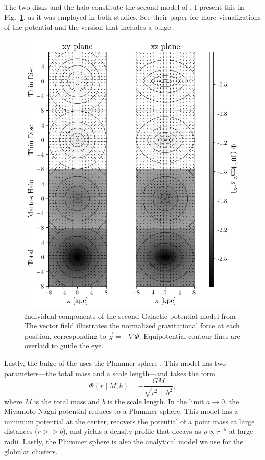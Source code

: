         The two disks and the halo constitute the second model of \citet{2017A&A...598A..66P}. I present this in Fig.~\ref{fig:figure_pouliasis2017pii_potential}, as it was employed in both studies. See their paper for more visualizations of the potential and the version that includes a bulge.
        \begin{figure}
            \centering
            \includegraphics[width=\linewidth]{images/figure_pouliasis2017pii_potential_-8_8.png}
            \caption{Individual components of the second Galactic potential model from \citet{2017A&A...598A..66P}. The vector field illustrates the normalized gravitational force at each position, corresponding to $\vec{g} = -\nabla\Phi$. Equipotential contour lines are overlaid to guide the eye.}
            \label{fig:figure_pouliasis2017pii_potential}
        \end{figure}        

        Lastly, the bulge of the \citet{2017A&A...598A..66P} uses the Plummer sphere \citep{1911MNRAS..71..460P}. This model has two parameters—the total mass and a scale length—and takes the form
        \begin{equation} \label{eq:plummer}
            \Phi(r \mid M, b) = -\frac{G M}{\sqrt{r^2 + b^2}},
        \end{equation}
        where $M$ is the total mass and $b$ is the scale length. In the limit $a \rightarrow 0$, the Miyamoto-Nagai potential reduces to a Plummer sphere. This model has a minimum potential at the center, recovers the potential of a point mass at large distances ($r >> b$), and yields a density profile that decays as $\rho \propto r^{-5}$ at large radii. Lastly, the Plummer sphere is also the analytical model we use for the globular clusters.

